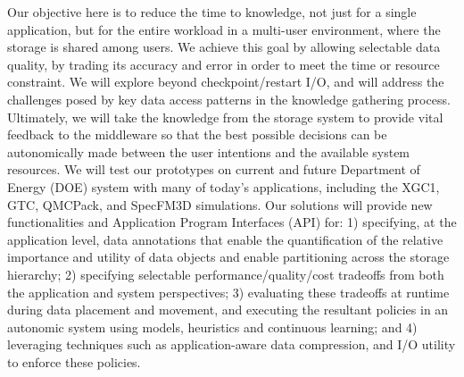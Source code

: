 Our objective here is to reduce the time to knowledge, not just for a single
application, but for the entire workload in a multi-user environment, where
the storage is shared among users.
We achieve this goal by allowing selectable data quality, by trading its accuracy and error
in order to meet the time or resource constraint. 
We will explore beyond 
checkpoint/restart I/O, and will address the challenges posed by 
key
data access patterns in the knowledge gathering process.
Ultimately, we will take the knowledge from the storage system to provide vital feedback to the middleware 
so that the best possible decisions can be autonomically made between the user intentions and
the available system resources.  
We will test our prototypes  on current and future Department of Energy (DOE) system with many of today's applications, including the
XGC1, GTC, QMCPack, and SpecFM3D simulations. 
Our solutions will provide  new functionalities and Application Program Interfaces (API) for:
1) specifying, at the application level, data annotations that enable the
quantification of the relative importance and utility of data objects and
enable partitioning  across the storage hierarchy;
2) specifying selectable performance/quality/cost tradeoffs from both the
application and system perspectives;
3) evaluating these tradeoffs at runtime during data placement and movement,
and executing the resultant policies in an autonomic system using models,
heuristics and continuous learning; and
4) leveraging techniques such as application-aware data compression, 
and  I/O utility to enforce these
policies.
\noindent

\vfill
